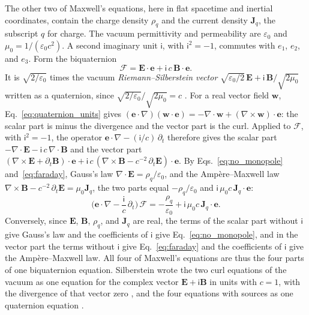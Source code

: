 \documentclass[aps,prd,onecolumn,tightenlines,nofootinbib,notitlepage,11pt,floatfix]{revtex4-2}
\theoremstyle{indentedtheorem}
\begin{document}
The other two of Maxwell's equations, here in flat spacetime and inertial coordinates, contain the charge density $\rho_q$ and the current density $\mathbf{J}_q$, the subscript $q$ for charge. The vacuum permittivity and permeability are $\varepsilon_0$ and $\mu_0=1/(\varepsilon_0c^2)$. A second imaginary unit $\mathsf{i}$, with $\mathsf{i}^2=-1$, commutes with $e_1$, $e_2$, and $e_3$. Form the biquaternion
\begin{equation}
    \mathcal{F} = \mathbf{E}\cdot\mathbf{e} + \mathsf{i}\,c\,\mathbf{B}\cdot\mathbf{e} .
    \label{eq:rs_biquaternion}
\end{equation}
It is $\sqrt{2/\varepsilon_0}$ times the vacuum \emph{Riemann--Silberstein vector} $\sqrt{\varepsilon_0/2}\,\mathbf{E}+\mathsf{i}\,\mathbf{B}/\sqrt{2\mu_0}$ written as a quaternion, since $\sqrt{2/\varepsilon_0}/\sqrt{2\mu_0}=c$ \citep{BialynickiBirula1996Photon}. For a real vector field $\mathbf{w}$, Eq.~\eqref{eq:quaternion_units} gives $(\mathbf{e}\cdot\nabla)(\mathbf{w}\cdot\mathbf{e})=-\nabla\cdot\mathbf{w}+(\nabla\times\mathbf{w})\cdot\mathbf{e}$: the scalar part is minus the divergence and the vector part is the curl. Applied to $\mathcal{F}$, with $\mathsf{i}^2=-1$, the operator $\mathbf{e}\cdot\nabla-(\mathsf{i}/c)\,\partial_t$ therefore gives the scalar part $-\nabla\cdot\mathbf{E}-\mathsf{i}\,c\,\nabla\cdot\mathbf{B}$ and the vector part $(\nabla\times\mathbf{E}+\partial_t\mathbf{B})\cdot\mathbf{e}+\mathsf{i}\,c\,(\nabla\times\mathbf{B}-c^{-2}\,\partial_t\mathbf{E})\cdot\mathbf{e}$. By Eqs.~\eqref{eq:no_monopole} and~\eqref{eq:faraday}, Gauss's law $\nabla\cdot\mathbf{E}=\rho_q/\varepsilon_0$, and the Amp\`ere--Maxwell law $\nabla\times\mathbf{B}-c^{-2}\,\partial_t\mathbf{E}=\mu_0\mathbf{J}_q$, the two parts equal $-\rho_q/\varepsilon_0$ and $\mathsf{i}\,\mu_0c\,\mathbf{J}_q\cdot\mathbf{e}$:
\begin{equation}
    \Big(\mathbf{e}\cdot\nabla-\frac{\mathsf{i}}{c}\,\partial_t\Big)\,\mathcal{F} = -\frac{\rho_q}{\varepsilon_0} + \mathsf{i}\,\mu_0c\,\mathbf{J}_q\cdot\mathbf{e} .
    \label{eq:maxwell_biquaternion}
\end{equation}
Conversely, since $\mathbf{E}$, $\mathbf{B}$, $\rho_q$, and $\mathbf{J}_q$ are real, the terms of the scalar part without $\mathsf{i}$ give Gauss's law and the coefficients of $\mathsf{i}$ give Eq.~\eqref{eq:no_monopole}, and in the vector part the terms without $\mathsf{i}$ give Eq.~\eqref{eq:faraday} and the coefficients of $\mathsf{i}$ give the Amp\`ere--Maxwell law. All four of Maxwell's equations are thus the four parts of one biquaternion equation. Silberstein wrote the two curl equations of the vacuum as one equation for the complex vector $\mathbf{E}+\mathsf{i}\mathbf{B}$ in units with $c=1$, with the divergence of that vector zero \citep{Silberstein1907Elektromagnetische}, and the four equations with sources as one quaternion equation \citep{Silberstein1912Quaternionic}.
\end{document}
